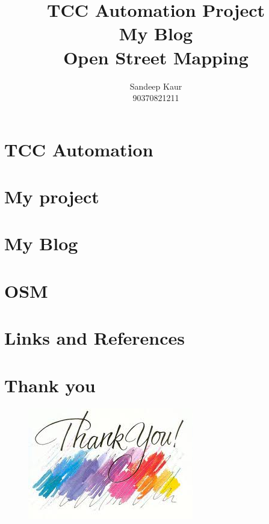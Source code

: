 \documentclass[15pt]{beamer}
\title[TCC Automation]{TCC Automation Project \\ My Blog \\ Open Street Mapping}
\author{Sandeep Kaur \\ 90370821211}
\institute{Dept. of Information Technology}
\begin{document}
\begin{frame}
\titlepage
\end{frame}

\newpage
\section{TCC Automation}

\newpage
\section{My project}

\newpage
\section{My Blog}


\newpage
\section{OSM}


\newpage
\section{Links and References}


\newpage
\section{Thank you}
\begin{figure}
\label{imag}
\centering
\includegraphics[scale=0.4]{tu.jpeg}
\end{figure}
\end{document}
